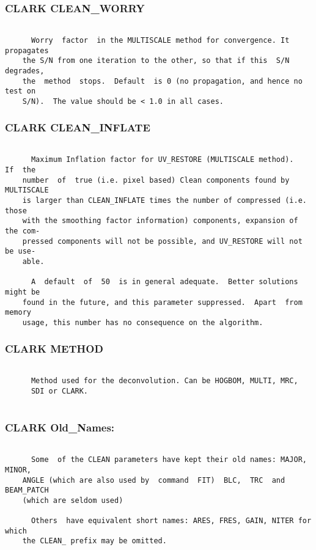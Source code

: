 \subsubsection{CLARK CLEAN\_WORRY}
\begin{verbatim}

      Worry  factor  in the MULTISCALE method for convergence. It propagates
    the S/N from one iteration to the other, so that if this  S/N  degrades,
    the  method  stops.  Default  is 0 (no propagation, and hence no test on
    S/N).  The value should be < 1.0 in all cases.

\end{verbatim}
\subsubsection{CLARK CLEAN\_INFLATE}
\begin{verbatim}

      Maximum Inflation factor for UV_RESTORE (MULTISCALE method).   If  the
    number  of  true (i.e. pixel based) Clean components found by MULTISCALE
    is larger than CLEAN_INFLATE times the number of compressed (i.e.  those
    with the smoothing factor information) components, expansion of the com-
    pressed components will not be possible, and UV_RESTORE will not be use-
    able.

      A  default  of  50  is in general adequate.  Better solutions might be
    found in the future, and this parameter suppressed.  Apart  from  memory
    usage, this number has no consequence on the algorithm.

\end{verbatim}
\subsubsection{CLARK METHOD}
\begin{verbatim}

      Method used for the deconvolution. Can be HOGBOM, MULTI, MRC,
      SDI or CLARK.


\end{verbatim}
\subsubsection{CLARK Old\_Names:}
\begin{verbatim}

      Some  of the CLEAN parameters have kept their old names: MAJOR, MINOR,
    ANGLE (which are also used by  command  FIT)  BLC,  TRC  and  BEAM_PATCH
    (which are seldom used)

      Others  have equivalent short names: ARES, FRES, GAIN, NITER for which
    the CLEAN_ prefix may be omitted.

\end{verbatim}
